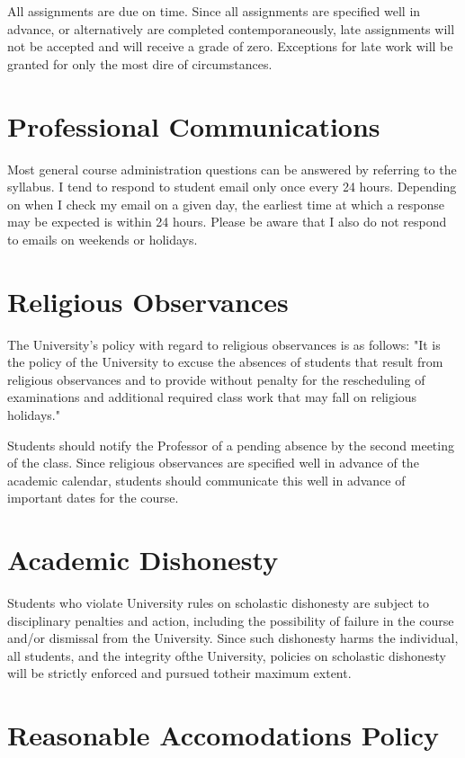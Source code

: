 \documentclass[a4paper,12pt]{article}
\begin{document}
All  assignments  are  due  on  time.  Since  all  assignments  are  specified  well  in  advance, or alternatively are completed contemporaneously, late assignments will not be accepted and will receive a grade of zero. Exceptions for late work will be granted for only the most dire of circumstances.

\section*{Professional Communications}

Most general course administration questions can be answered by referring to the syllabus. I tend to respond to student email only once every 24 hours. Depending on when I check my email on a given day, the earliest time at which a response may be expected is within 24 hours. Please be aware that I also do not respond to emails on weekends or holidays.

\section*{Religious Observances}

The University's policy with regard to religious observances is as follows: "It is the policy of the University to excuse the absences of students that result from religious observances and to provide without penalty for the rescheduling of examinations and additional required class work that may fall on religious holidays."

Students should notify the Professor of a pending absence by the second meeting of the class. Since religious observances are specified well in advance of the academic calendar, students should communicate this well in advance of important dates for the course.

\section*{Academic Dishonesty}

Students who violate University rules on scholastic dishonesty are subject to disciplinary penalties and action, including the possibility of failure in the  course and/or dismissal from the University. Since such dishonesty harms the individual, all students, and the integrity ofthe University, policies on scholastic dishonesty will be strictly enforced and pursued totheir maximum extent.

\section*{Reasonable Accomodations Policy}
\end{document}
